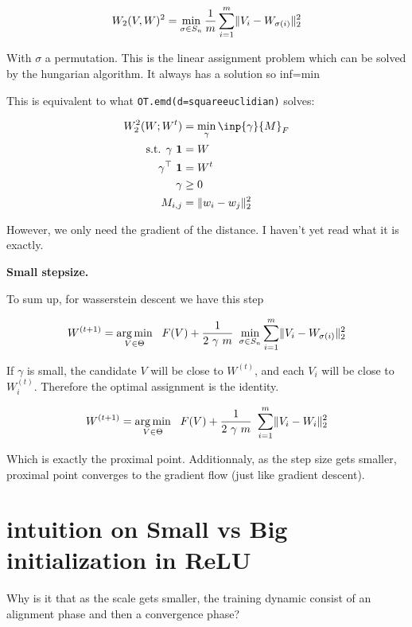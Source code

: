 \begin{equation}
	W_2(V, W)^2 = \min_{\sigma \in S_n} \frac{1}{m} \sum_{i=1}^{m} \lVert V_i - W_{\sigma(i)}\rVert^2_2
\end{equation}

With $\sigma$ a permutation. This is the linear assignment problem which can be solved by the hungarian algorithm. It always has a solution so inf=min

This is equivalent to what \texttt{OT.emd(d=squareeuclidian)} solves:

\begin{align}
	W_2^2(W; W^t) &= \min_{\gamma} \inp{\gamma}{M}_F \\
	\text{s.t.  } \gamma ~ \mathbf{1} &= W \\
	\gamma^\top ~ \mathbf{1} &= W^t \\
	\gamma &\geq 0 \\
	M_{i, j} &= \lVert w_i - w_j \rVert^2_2
\end{align}

However, we only need the gradient of the distance. I haven't yet read what it is exactly.

\textbf{Small stepsize.}

To sum up, for wasserstein descent we have this step

\begin{equation}
	W^{(t+1)} = \argmin_{V \in \Theta} \ \  F(V) + \frac{1}{2 ~ \gamma ~ m} ~ \min_{\sigma \in S_n} \sum_{i=1}^{m} \norm{V_i - W_{\sigma(i)}}^2_2
\end{equation}

If $\gamma$ is small, the candidate $V$ will be close to $W^{(t)}$, and each $V_i$ will be close to $W^{(t)}_i$. Therefore the optimal assignment is the identity.

\begin{equation}
	W^{(t+1)} = \argmin_{V \in \Theta} \ \  F(V) + \frac{1}{2 ~ \gamma ~ m} ~ \sum_{i=1}^{m} \norm{V_i - W_i}^2_2
\end{equation}

Which is exactly the proximal point. Additionnaly, as the step size gets smaller, proximal point converges to the gradient flow (just like gradient descent).

\section{intuition on Small vs Big initialization in ReLU}

Why is it that as the scale gets smaller, the training dynamic consist of an alignment phase and then a convergence phase?

